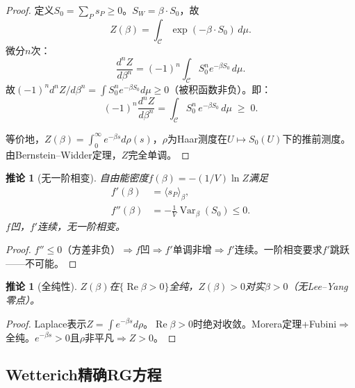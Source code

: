 \documentclass[12pt,a4paper]{article}
\theoremstyle{plain}
\newtheorem{corollary}[theorem]{推论}
\theoremstyle{definition}
\theoremstyle{remark}
\begin{document}
\begin{proof}
定义$S_0=\sum_P s_P\geq 0$。$S_W=\beta\cdot S_0$，故
\begin{equation}\label{eq:Zlaplace}
Z(\beta) = \int_{\mathcal{C}} \exp(-\beta\cdot S_0)\,d\mu.
\end{equation}
微分$n$次：
\begin{equation}\label{eq:cmderiv}
\frac{d^nZ}{d\beta^n} = (-1)^n\int_{\mathcal{C}} S_0^n e^{-\beta S_0}\,d\mu.
\end{equation}
故$(-1)^n d^nZ/d\beta^n = \int S_0^n e^{-\beta S_0}d\mu \geq 0$（被积函数非负）。即：
\begin{equation}
(-1)^n\frac{d^nZ}{d\beta^n} = \int_{\mathcal{C}} S_0^n\,e^{-\beta S_0}\,d\mu \;\geq\; 0.
\end{equation}

等价地，$Z(\beta)=\int_0^\infty e^{-\beta s}d\rho(s)$，$\rho$为Haar测度在$U\mapsto S_0(U)$下的推前测度。由Bernstein--Widder定理\cite{Bernstein1929,Widder1941}，$Z$完全单调。
\end{proof}

\begin{corollary}[无一阶相变]\label{cor:no1st}
自由能密度$f(\beta)=-(1/V)\ln Z$满足
\begin{align}
f'(\beta) &= \langle s_P\rangle_\beta, \label{eq:fprime}\\
f''(\beta) &= -\frac{1}{V}\operatorname{Var}_\beta(S_0) \leq 0. \label{eq:fdprime}
\end{align}
$f$凹，$f'$连续，无一阶相变。
\end{corollary}

\begin{proof}
$f''\leq 0$（方差非负）$\Rightarrow f$凹$\Rightarrow f'$单调非增$\Rightarrow f'$连续。一阶相变要求$f'$跳跃——不可能。
\end{proof}

\begin{corollary}[全纯性]\label{cor:holo}
$Z(\beta)$在$\{\operatorname{Re}\beta>0\}$全纯，$Z(\beta)>0$对实$\beta>0$（无Lee--Yang零点）。
\end{corollary}

\begin{proof}
Laplace表示$Z=\int e^{-\beta s}d\rho$。$\operatorname{Re}\beta>0$时绝对收敛。Morera定理+Fubini$\Rightarrow$全纯。$e^{-\beta s}>0$且$\rho$非平凡$\Rightarrow Z>0$。
\end{proof}

\subsection{Wetterich精确RG方程}\label{sec:ERG}
\end{document}
